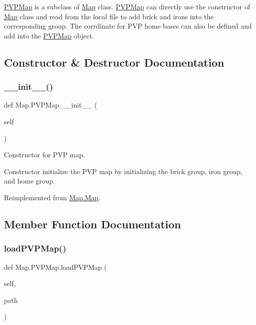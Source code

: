 \mbox{\hyperlink{class_map_1_1_p_v_p_map}{P\+V\+P\+Map}} is a subclass of \mbox{\hyperlink{class_map_1_1_map}{Map}} class. \mbox{\hyperlink{class_map_1_1_p_v_p_map}{P\+V\+P\+Map}} can directly use the constructor of \mbox{\hyperlink{class_map_1_1_map}{Map}} class and read from the local file to add brick and irons into the corresponding group. The corrdinate for P\+VP home bases can also be defined and add into the \mbox{\hyperlink{class_map_1_1_p_v_p_map}{P\+V\+P\+Map}} object. 

\subsection{Constructor \& Destructor Documentation}
\mbox{\label{class_map_1_1_p_v_p_map_a9d6a84ac6a94e5394a7157f885603a0c}} 
\subsubsection{\texorpdfstring{\_\_init\_\_()}{\_\_init\_\_()}}
{\footnotesize\ttfamily def Map.\+P\+V\+P\+Map.\+\_\+\+\_\+init\+\_\+\+\_\+ (\begin{DoxyParamCaption}\item[{}]{self }\end{DoxyParamCaption})}



Constructor for P\+VP map. 

Constructor initialize the P\+VP map by initializing the brick group, iron group, and home group. 

Reimplemented from \mbox{\hyperlink{class_map_1_1_map_a16b297030b6f61b2601cd40d2e5b5e0d}{Map.\+Map}}.



\subsection{Member Function Documentation}
\mbox{\label{class_map_1_1_p_v_p_map_a3a5bc78f48b960e2b9c57615587ae523}} 
\subsubsection{\texorpdfstring{loadPVPMap()}{loadPVPMap()}}
{\footnotesize\ttfamily def Map.\+P\+V\+P\+Map.\+load\+P\+V\+P\+Map (\begin{DoxyParamCaption}\item[{}]{self,  }\item[{}]{path }\end{DoxyParamCaption})}




